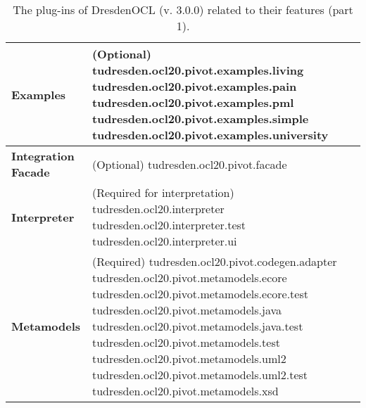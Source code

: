 \begin{table}[h]
\begin{tabular}{|p{4cm}|p{10cm}|}
    \textbf{Examples} &
    (Optional)\newline
    tudresden.ocl20.pivot.examples.living\newline
    tudresden.ocl20.pivot.examples.pain\newline
    tudresden.ocl20.pivot.examples.pml\newline
    tudresden.ocl20.pivot.examples.simple\newline
    tudresden.ocl20.pivot.examples.university\\
    \hline

    \textbf{Integration Facade} &
    (Optional)\newline
    tudresden.ocl20.pivot.facade\\
    \hline

    \textbf{Interpreter} &
    (Required for interpretation)\newline
    tudresden.ocl20.interpreter\newline
    tudresden.ocl20.interpreter.test\newline
    tudresden.ocl20.interpreter.ui\\
    \hline
 
    \textbf{Metamodels} &
    (Required)\newline
    tudresden.ocl20.pivot.codegen.adapter\newline
    tudresden.ocl20.pivot.metamodels.ecore\newline
    tudresden.ocl20.pivot.metamodels.ecore.test\newline
    tudresden.ocl20.pivot.metamodels.java\newline
    tudresden.ocl20.pivot.metamodels.java.test\newline
    tudresden.ocl20.pivot.metamodels.test\newline
    tudresden.ocl20.pivot.metamodels.uml2\newline
    tudresden.ocl20.pivot.metamodels.uml2.test\newline
    tudresden.ocl20.pivot.metamodels.xsd\\
    \hline
 
\end{tabular}
\caption{The plug-ins of DresdenOCL (v. 3.0.0) related to their features (part 1).}
\label{tab:plugins}
\end{table}

